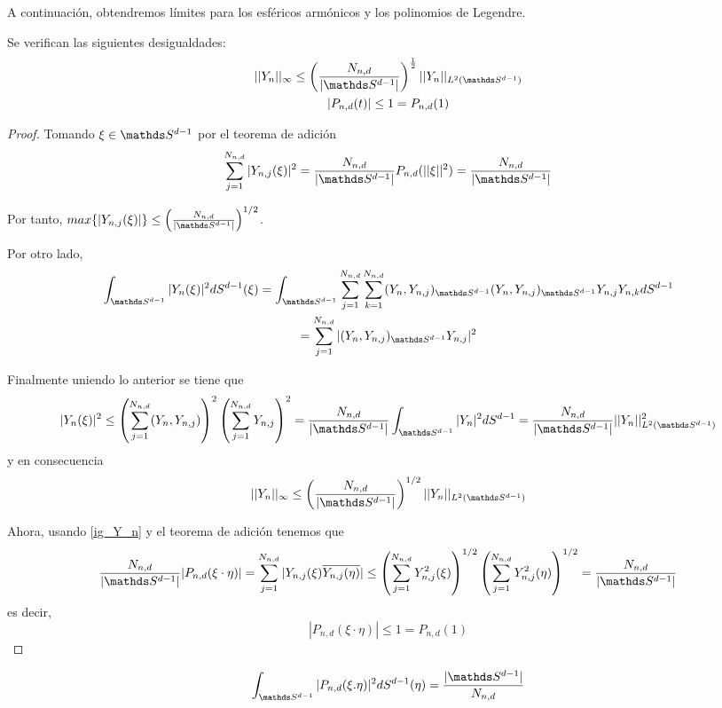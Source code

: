 A continuación, obtendremos límites para los esféricos armónicos y los polinomios de Legendre.
\begin{prop}Se verifican las siguientes desigualdades:
	\begin{gather}
		||Y_n||_\infty \le \left(\frac{N_{n,d}}{|\sphere|}\right)^{\frac{1}{2}}||Y_n||_{L^2(\sphere)} \\
		|P_{n,d}(t)| \le 1 = P_{n,d}(1)
	\end{gather}
\end{prop}
\begin{proof}Tomando $\xi \in \sphere$ por el teorema de adición 
	\begin{gather}\label{ig_Y_n}
		\sum_{j=1}^{N_{n,d}} |Y_{n,j}(\xi)|^2 = \frac{N_{n,d}}{|\sphere|} P_{n,d}(||\xi||^2) = \frac{N_{n,d}}{|\sphere|}
	\end{gather}

Por tanto, $max\{|Y_{n,j}(\xi)|\}\le \left(\frac{N_{n,d}}{|\sphere|}\right)^{1/2}$.
\medskip

Por otro lado, 
\begin{gather*}
\sphint |Y_n(\xi)|^2 dS^{d-1}(\xi) = \sphint \sum_{j=1}^{N_{n,d}} \sum_{k=1}^{N_{n,d}}(Y_n,Y_{n,j})_{\sphere}(Y_n,Y_{n,j})_{\sphere}Y_{n,j}Y_{n,k}dS^{d-1} \\=\sum_{j=1}^{N_{n,d}}|(Y_n,Y_{n,j})_{\sphere}Y_{n,j}|^2
\end{gather*}

Finalmente uniendo lo anterior se tiene que 
\begin{gather*}
|Y_n(\xi)|^2 \le \left(\sum_{j=1}^{N_{n,d}}(Y_n,Y_{n,j})\right)^2\left(\sum_{j=1}^{N_{n,d}}Y_{n,j}\right)^2 =\frac{N_{n,d}}{|\sphere|} \sphint |Y_n|^2 dS^{d-1}  =\frac{N_{n,d}}{|\sphere|}||Y_n||^2_{L^2(\sphere)}
\end{gather*}
y en consecuencia 
$$  ||Y_n||_{\infty} \le \left(\frac{N_{n,d}}{|\sphere|}\right)^{1/2} ||Y_n||_{L^2(\sphere)}$$

Ahora, usando \hyperref[]{\ref{ig_Y_n}} y el teorema de adición tenemos que
\begin{gather*}
\frac{N_{n,d}}{|\sphere|}|P_{n,d}(\xi\cdot\eta)| = \sum_{j=1}^{N_{n,d}}|Y_{n,j}(\xi)\overline{Y_{n,j}(\eta)}| \le \left(\sum_{j=1}^{N_{n,d}} Y^2_{n,j}(\xi)\right)^{1/2}\left(\sum_{j=1}^{N_{n,d}} Y^2_{n,j}(\eta)\right)^{1/2} = \frac{N_{n,d}}{|\sphere|}
\end{gather*}
es decir, 
$$
|P_{n,d}(\xi\cdot\eta)| \le 1 = P_{n,d}(1)
$$
\end{proof}
\begin{prop}\label{prop:2}
	$$\sphint |P_{n,d}(\xi.\eta)|^2 dS^{d-1}(\eta) = \frac{|\sphere|}{N_{n,d}}
	$$
\end{prop}
